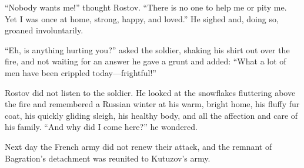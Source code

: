 ``Nobody wants me!'' thought Rostov. ``There is no one to help me
or pity me. Yet I was once at home, strong, happy, and loved.''
He sighed and, doing so, groaned involuntarily.

``Eh, is anything hurting you?'' asked the soldier, shaking his
shirt out over the fire, and not waiting for an answer he gave a
grunt and added: ``What a lot of men have been crippled
today---frightful!''

Rostov did not listen to the soldier. He looked at the snowflakes
fluttering above the fire and remembered a Russian winter at his
warm, bright home, his fluffy fur coat, his quickly gliding
sleigh, his healthy body, and all the affection and care of his
family. ``And why did I come here?'' he wondered.

Next day the French army did not renew their attack, and the
remnant of Bagration's detachment was reunited to Kutuzov's army.

